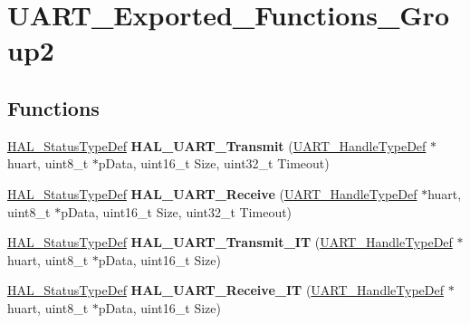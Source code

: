 \hypertarget{group___u_a_r_t___exported___functions___group2}{}\section{U\+A\+R\+T\+\_\+\+Exported\+\_\+\+Functions\+\_\+\+Group2}
\label{group___u_a_r_t___exported___functions___group2}
\subsection*{Functions}
\begin{DoxyCompactItemize}
\item 
\hyperlink{stm32f4xx__hal__def_8h_a63c0679d1cb8b8c684fbb0632743478f}{H\+A\+L\+\_\+\+Status\+Type\+Def} {\bfseries H\+A\+L\+\_\+\+U\+A\+R\+T\+\_\+\+Transmit} (\hyperlink{struct_u_a_r_t___handle_type_def}{U\+A\+R\+T\+\_\+\+Handle\+Type\+Def} $\ast$huart, uint8\+\_\+t $\ast$p\+Data, uint16\+\_\+t Size, uint32\+\_\+t Timeout)\hypertarget{group___u_a_r_t___exported___functions___group2_ga210329848c1873957034e129ccf8944e}{}\label{group___u_a_r_t___exported___functions___group2_ga210329848c1873957034e129ccf8944e}

\item 
\hyperlink{stm32f4xx__hal__def_8h_a63c0679d1cb8b8c684fbb0632743478f}{H\+A\+L\+\_\+\+Status\+Type\+Def} {\bfseries H\+A\+L\+\_\+\+U\+A\+R\+T\+\_\+\+Receive} (\hyperlink{struct_u_a_r_t___handle_type_def}{U\+A\+R\+T\+\_\+\+Handle\+Type\+Def} $\ast$huart, uint8\+\_\+t $\ast$p\+Data, uint16\+\_\+t Size, uint32\+\_\+t Timeout)\hypertarget{group___u_a_r_t___exported___functions___group2_gab868edc590e3b827a14528a25c999e2f}{}\label{group___u_a_r_t___exported___functions___group2_gab868edc590e3b827a14528a25c999e2f}

\item 
\hyperlink{stm32f4xx__hal__def_8h_a63c0679d1cb8b8c684fbb0632743478f}{H\+A\+L\+\_\+\+Status\+Type\+Def} {\bfseries H\+A\+L\+\_\+\+U\+A\+R\+T\+\_\+\+Transmit\+\_\+\+IT} (\hyperlink{struct_u_a_r_t___handle_type_def}{U\+A\+R\+T\+\_\+\+Handle\+Type\+Def} $\ast$huart, uint8\+\_\+t $\ast$p\+Data, uint16\+\_\+t Size)\hypertarget{group___u_a_r_t___exported___functions___group2_gaf223f2bcc2f5734f147cc5c626d757b0}{}\label{group___u_a_r_t___exported___functions___group2_gaf223f2bcc2f5734f147cc5c626d757b0}

\item 
\hyperlink{stm32f4xx__hal__def_8h_a63c0679d1cb8b8c684fbb0632743478f}{H\+A\+L\+\_\+\+Status\+Type\+Def} {\bfseries H\+A\+L\+\_\+\+U\+A\+R\+T\+\_\+\+Receive\+\_\+\+IT} (\hyperlink{struct_u_a_r_t___handle_type_def}{U\+A\+R\+T\+\_\+\+Handle\+Type\+Def} $\ast$huart, uint8\+\_\+t $\ast$p\+Data, uint16\+\_\+t Size)\hypertarget{group___u_a_r_t___exported___functions___group2_gadc0c3ef2109881d011601f0d41e70e40}{}\label{group___u_a_r_t___exported___functions___group2_gadc0c3ef2109881d011601f0d41e70e40}


\end{DoxyCompactItemize}
